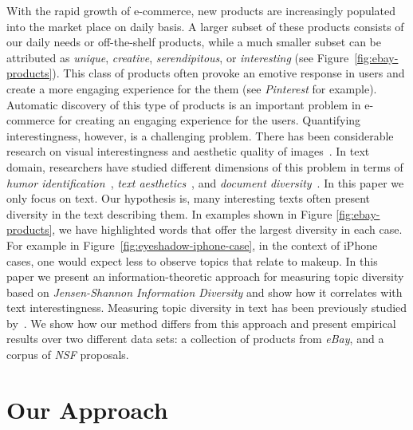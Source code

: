 \documentclass{article}
\begin{document}
With the rapid growth of e-commerce, new products are increasingly populated into the market place on daily basis.  A larger subset of these products consists of our daily needs or off-the-shelf products, while a much smaller subset can be attributed as {\em unique}, {\em creative}, {\em serendipitous}, or {\em interesting} (see Figure~\ref{fig:ebay-products}). This class of products often provoke an emotive response in users and create a more engaging experience for the them (see  {\em Pinterest} for example). Automatic discovery of this type of products is an important problem in e-commerce for creating an engaging experience for the users.   Quantifying interestingness, however,  is a challenging problem. There has been considerable research on visual interestingness and aesthetic quality of images~\cite{Datta:2006:SAP:2129560.2129588,Ke:2006:DHF:1153170.1153495,IsolaParikhTorralbaOliva2011,dhar:2011,reinecke2013predicting,journals/pami/WeinshallZHKOABGNPHP12}. 
In text domain, researchers have studied different dimensions of this
problem in terms of {\em humor
  identification}~\cite{Mihalcea:2005:MCL:1220575.1220642,Davidov:2010:SRS:1870568.1870582,Kiddon11,labutov-lipson:2012:ACL2012short},
{\em text
  aesthetics}~\cite{journals:tamd:Schmidhuber10,N13-1118,ganguly:2014},
and {\em document diversity}~\cite{bache:2013}.  In this paper we only
focus on text. Our hypothesis is, many interesting texts often
present diversity in the text describing them. In examples shown in Figure \ref{fig:ebay-products}, we have highlighted words that offer the largest diversity in each case.
For example in Figure~\ref{fig:eyeshadow-iphone-case}, in the context of iPhone cases, one would expect less to observe topics that relate to makeup. In this paper we present an information-theoretic approach for measuring topic diversity based on {\em Jensen-Shannon Information Diversity} and show how it correlates with text interestingness. Measuring topic diversity in text has been previously studied by~\cite{bache:2013}. We show how our method differs from this approach and present empirical results over two different data sets: a collection of products from {\sl eBay}, and a corpus of {\sl NSF} proposals. 




\section{Our Approach}
\label{sec:our-approach}
\end{document}
